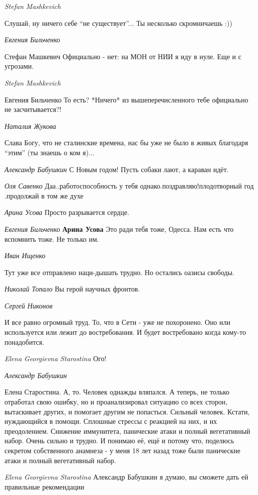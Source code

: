 \emph{Stefan Mashkevich}

Слушай, ну ничего себе \enquote{не существует}...
Ты несколько скромничаешь :))

\emph{Евгения Бильченко}

Стефан Машкевич Официально - нет: на МОН от НИИ я иду в нуле. Еще и с угрозами.

\emph{Stefan Mashkevich}

Евгения Бильченко То есть? *Ничего* из вышеперечисленного тебе официально не засчитывается?!

\emph{Наталия Жукова}

Слава Богу, что не сталинские времена, нас бы уже не было в живых благодаря \enquote{этим} (ты знаешь о ком я)...

\emph{Александр Бабушкин}
С Новым годом!  Пусть собаки лают, а караван идёт.

\emph{Оля Савенко}
Даа..работоспособность у тебя однако.поздравляю!плодотворный год .продолжай в том же духе

\emph{Арина Усова}
Просто разрывается сердце.

\emph{Евгения Бильченко}
\textbf{Арина Усова} Это ради тебя тоже, Одесса. Нам есть что вспомнить тоже. Не только им.

\emph{Иван Ищенко}

Тут уже все отправлено наци-дышать трудно. Но остались оазисы свободы.

\emph{Николай Топало}
Вы герой научных фронтов.

\emph{Сергей Никонов}

И все равно огромный труд. То, что в Сети - уже не похоронено. Оно или
используется или лежит до востребования. И будет востребовано когда кому-то
понадобится.

\emph{Elena Georgievna Starostina}
Ого!

\emph{Александр Бабушкин}

Елена Старостина.
А, то.
Человек однажды вляпался.
А теперь, не только отработал свою ошибку, но и проанализировал ситуацию со всех сторон, вытаскивает других, и помогает другим не попасться. Сильный человек. Кстати, нуждающийся в помощи.
Сплошные стрессы с реакцией на них, и их преодолением. Снижение иммунитета, панические атаки и полный вегетативный набор.
Очень сильно и трудно.
И понимаю её, ещё и потому что, поделюсь секретом собственного анамнеза - у меня 18 лет назад тоже были панические атаки и полный вегетативный набор.

\emph{Elena Georgievna Starostina}
Александр Бабушкин я думаю, вы сможете дать ей правильные рекомендации

